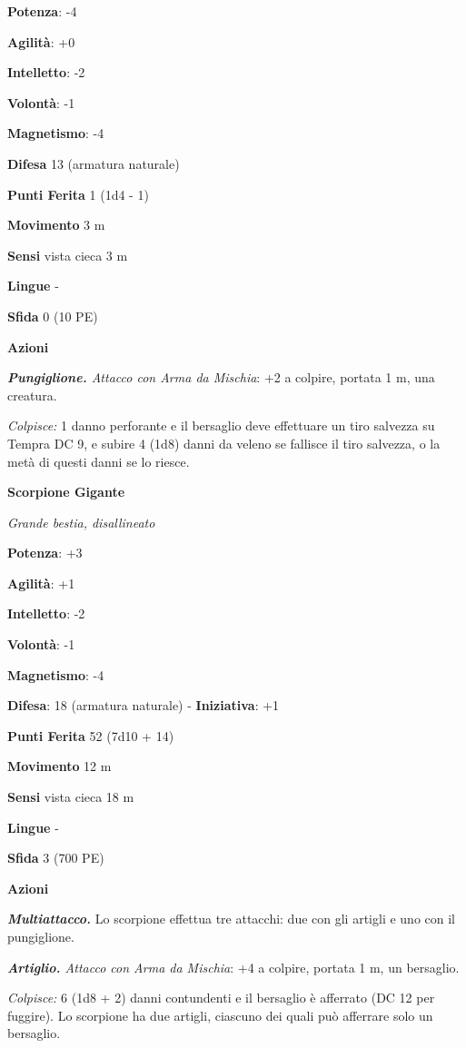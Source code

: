 \begin{multicols}{2}
\textbf{Potenza}: -4

\textbf{Agilità}: +0

\textbf{Intelletto}: -2

\textbf{Volontà}: -1

\textbf{Magnetismo}: -4

\textbf{Difesa} 13 (armatura naturale)

\textbf{Punti Ferita} 1 (1d4 - 1)

\textbf{Movimento} 3 m

\textbf{Sensi} vista cieca 3 m

\textbf{Lingue} -

\textbf{Sfida} 0 (10 PE)\smallskip

\smallskip\textbf{Azioni}

\emph{\textbf{Pungiglione.} Attacco con Arma da Mischia}: +2 a colpire,
portata 1 m, una creatura.

\emph{Colpisce:} 1 danno perforante e il bersaglio deve effettuare un
tiro salvezza su Tempra DC 9, e subire 4 (1d8) danni da veleno se
fallisce il tiro salvezza, o la metà di questi danni se lo riesce.

\textbf{Scorpione Gigante}

\emph{Grande bestia, disallineato}

\textbf{Potenza}: +3

\textbf{Agilità}: +1

\textbf{Intelletto}: -2

\textbf{Volontà}: -1

\textbf{Magnetismo}: -4

\textbf{Difesa}: 18 (armatura naturale) - \textbf{Iniziativa}: +1

\textbf{Punti Ferita} 52 (7d10 + 14)

\textbf{Movimento} 12 m

\textbf{Sensi} vista cieca 18 m

\textbf{Lingue} -

\textbf{Sfida} 3 (700 PE)\smallskip

\smallskip\textbf{Azioni}

\emph{\textbf{Multiattacco.}} Lo scorpione effettua tre attacchi: due
con gli artigli e uno con il pungiglione.

\emph{\textbf{Artiglio.} Attacco con Arma da Mischia}: +4 a colpire,
portata 1 m, un bersaglio.

\emph{Colpisce:} 6 (1d8 + 2) danni contundenti e il bersaglio è
afferrato (DC 12 per fuggire). Lo scorpione ha due artigli, ciascuno dei
quali può afferrare solo un bersaglio.


\end{multicols}

